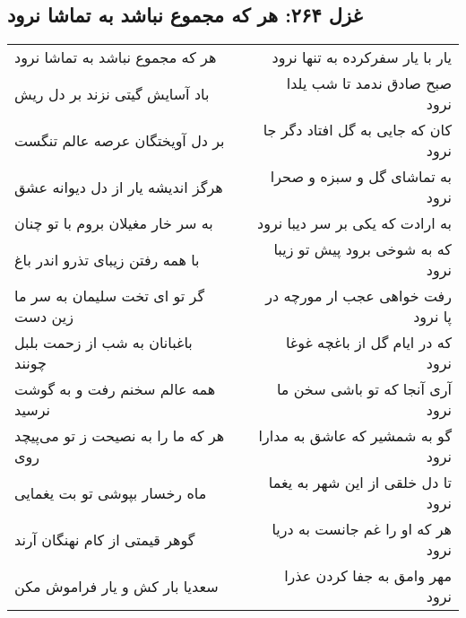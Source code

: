 \begin{center}
\section*{غزل ۲۶۴: هر که مجموع نباشد به تماشا نرود}
\label{sec:264}
\begin{longtable}{l p{0.5cm} r}
هر که مجموع نباشد به تماشا نرود
&&
یار با یار سفرکرده به تنها نرود
\\
باد آسایش گیتی نزند بر دل ریش
&&
صبح صادق ندمد تا شب یلدا نرود
\\
بر دل آویختگان عرصه عالم تنگست
&&
کان که جایی به گل افتاد دگر جا نرود
\\
هرگز اندیشه یار از دل دیوانه عشق
&&
به تماشای گل و سبزه و صحرا نرود
\\
به سر خار مغیلان بروم با تو چنان
&&
به ارادت که یکی بر سر دیبا نرود
\\
با همه رفتن زیبای تذرو اندر باغ
&&
که به شوخی برود پیش تو زیبا نرود
\\
گر تو ای تخت سلیمان به سر ما زین دست
&&
رفت خواهی عجب ار مورچه در پا نرود
\\
باغبانان به شب از زحمت بلبل چونند
&&
که در ایام گل از باغچه غوغا نرود
\\
همه عالم سخنم رفت و به گوشت نرسید
&&
آری آنجا که تو باشی سخن ما نرود
\\
هر که ما را به نصیحت ز تو می‌پیچد روی
&&
گو به شمشیر که عاشق به مدارا نرود
\\
ماه رخسار بپوشی تو بت یغمایی
&&
تا دل خلقی از این شهر به یغما نرود
\\
گوهر قیمتی از کام نهنگان آرند
&&
هر که او را غم جانست به دریا نرود
\\
سعدیا بار کش و یار فراموش مکن
&&
مهر وامق به جفا کردن عذرا نرود
\\
\end{longtable}
\end{center}
